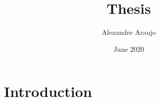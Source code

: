\documentclass{article}
\title{Thesis}
\author{Alexandre Araujo}
\date{June 2020}
\begin{document}
\maketitle

\section{Introduction}
\end{document}
